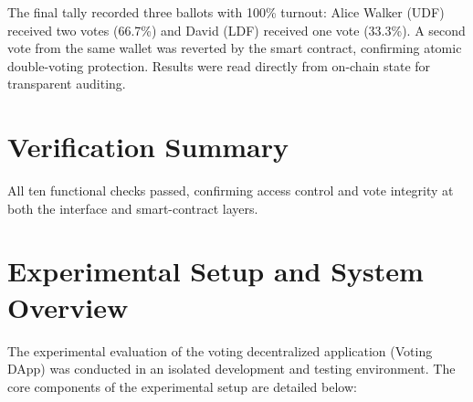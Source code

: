 \documentclass[12pt,a4paper]{report}
\begin{document}
The final tally recorded three ballots with 100\% turnout: Alice Walker (UDF) received two votes (66.7\%) and David (LDF) received one vote (33.3\%). A second vote from the same wallet was reverted by the smart contract, confirming atomic double-voting protection. Results were read directly from on-chain state for transparent auditing.

\section{Verification Summary}
All ten functional checks passed, confirming access control and vote integrity at both the interface and smart-contract layers.

\iffalse
\section{Experimental Setup and System Overview}
The experimental evaluation of the voting decentralized application (Voting DApp) was conducted in an isolated development and testing environment. The core components of the experimental setup are detailed below:
\end{document}
